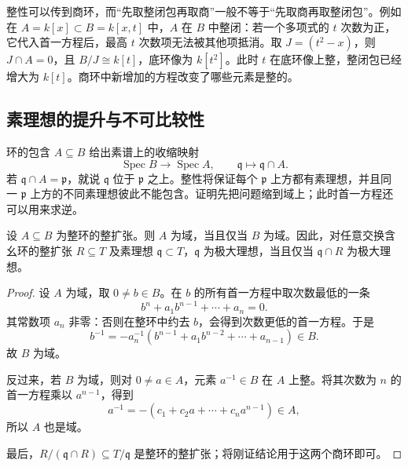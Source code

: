 整性可以传到商环，而“先取整闭包再取商”一般不等于“先取商再取整闭包”。例如在 \(A=k[x]\subset B=k[x,t]\) 中，\(A\) 在 \(B\) 中整闭：若一个多项式的 \(t\) 次数为正，它代入首一方程后，最高 \(t\) 次数项无法被其他项抵消。取 \(J=(t^2-x)\)，则 \(J\cap A=0\)，且 \(B/J\cong k[t]\)，底环像为 \(k[t^2]\)。此时 \(t\) 在底环像上整，整闭包已经增大为 \(k[t]\)。商环中新增加的方程改变了哪些元素是整的。

\subsection{素理想的提升与不可比较性}
\label{g5:subsec:0301:03}

环的包含 \(A\subseteq B\) 给出素谱上的收缩映射
\[
	\operatorname{Spec}B\longrightarrow\operatorname{Spec}A,
	\qquad \mathfrak q\longmapsto\mathfrak q\cap A.
\]
若 \(\mathfrak q\cap A=\mathfrak p\)，就说 \(\mathfrak q\) 位于 \(\mathfrak p\) 之上。整性将保证每个 \(\mathfrak p\) 上方都有素理想，并且同一 \(\mathfrak p\) 上方的不同素理想彼此不能包含。证明先把问题缩到域上；此时首一方程还可以用来求逆。

\begin{lemma}
\label{g5:lem:integral-field-extension}
	设 \(A\subseteq B\) 为整环的整扩张。则 \(A\) 为域，当且仅当 \(B\) 为域。因此，对任意交换含幺环的整扩张 \(R\subseteq T\) 及素理想 \(\mathfrak q\subset T\)，\(\mathfrak q\) 为极大理想，当且仅当 \(\mathfrak q\cap R\) 为极大理想。
\end{lemma}
\begin{proof}
	设 \(A\) 为域，取 \(0\ne b\in B\)。在 \(b\) 的所有首一方程中取次数最低的一条
	\[
		b^n+a_1b^{n-1}+\cdots+a_n=0.
	\]
	其常数项 \(a_n\) 非零：否则在整环中约去 \(b\)，会得到次数更低的首一方程。于是
	\[
		b^{-1}=-a_n^{-1}(b^{n-1}+a_1b^{n-2}+\cdots+a_{n-1})\in B.
	\]
	故 \(B\) 为域。

	反过来，若 \(B\) 为域，则对 \(0\ne a\in A\)，元素 \(a^{-1}\in B\) 在 \(A\) 上整。将其次数为 \(n\) 的首一方程乘以 \(a^{n-1}\)，得到
	\[
		a^{-1}=-(c_1+c_2a+\cdots+c_na^{n-1})\in A,
	\]
	所以 \(A\) 也是域。

	最后，\(R/(\mathfrak q\cap R)\subseteq T/\mathfrak q\) 是整环的整扩张；将刚证结论用于这两个商环即可。
\end{proof}

